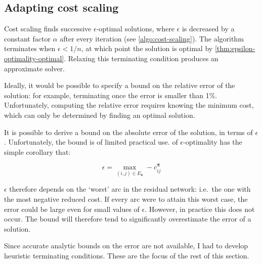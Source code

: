 \subsection{Adapting cost scaling} \label{sec:impl-approx-adaptions}

Cost scaling finds successive $\epsilon$-optimal solutions, where $\epsilon$ is decreased by a constant factor $\alpha$ after every iteration (see \cref{algo:cost-scaling}). The algorithm terminates when $\epsilon < 1/n$, at which point the solution is optimal by \cref{thm:epsilon-optimality-optimal}. Relaxing this terminating condition produces an approximate solver.

Ideally, it would be possible to specify a bound on the relative error of the solution: for example, terminating once the error is smaller than 1\%. Unfortunately, computing the relative error requires knowing the minimum cost, which can only be determined by finding an optimal solution.

It is possible to derive a bound on the absolute error of the solution, in terms of $\epsilon$. Unfortunately, the bound is of limited practical use.  of $\epsilon$-optimality has the simple corollary that:

\[\epsilon = \max_{(i,j) \in E_\mathbf{x}} -c_{ij}^{\boldsymbol{\pi}}\]

$\epsilon$ therefore depends on the `worst' arc in the residual network: i.e.\ the one with the most negative reduced cost. If every arc were to attain this worst case, the error could be large even for small values of $\epsilon$. However, in practice this does not occur. The bound will therefore tend to significantly overestimate the error of a solution.

Since accurate analytic bounds on the error are not available, I had to develop heuristic terminating conditions. These are the focus of the rest of this section.

%
%

